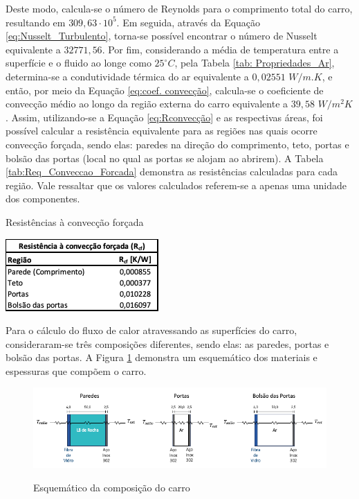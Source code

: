 \documentclass[acronym,symbols,table]{fei}
\begin{document}
Deste modo, calcula-se o número de Reynolds para o comprimento total do carro, resultando em $309,63 \cdot 10^5$. Em seguida, através da Equação \ref{eq:Nusselt_Turbulento}, torna-se possível encontrar o número de Nusselt equivalente a $32771,56$. Por fim, considerando a média de temperatura entre a superfície e o fluido ao longe como $25^\circ C$, pela Tabela \ref{tab: Propriedades_Ar}, determina-se a condutividade térmica do ar equivalente a $0,02551$ $W/m.K$, e então, por meio da Equação \ref{eq:coef. convecção}, calcula-se o coeficiente de convecção médio ao longo da região externa do carro equivalente a $39,58$ $W/m^2 K$. Assim, utilizando-se a Equação \ref{eq:Rconvecção} e as respectivas áreas, foi possível calcular a resistência equivalente para as regiões nas quais ocorre convecção forçada, sendo elas: paredes na direção do comprimento, teto, portas e bolsão das portas (local no qual as portas se alojam ao abrirem). A Tabela \ref{tab:Req_Conveccao_Forcada} demonstra as resistências calculadas para cada região. Vale ressaltar que os valores calculados referem-se a apenas uma unidade dos componentes. 

\begin{table}[!htb]
 \centering
    \caption{Resistências à convecção forçada}
    \includegraphics[width=0.4\linewidth]{Tabelas/Req_Conveccao_Forcada.png}
    \label{tab:Req_Conveccao_Forcada}
\end{table}

Para o cálculo do fluxo de calor atravessando as superfícies do carro, consideraram-se três composições diferentes, sendo elas: as paredes, portas e bolsão das portas. A Figura \ref{fig:Composicao_Vagao} demonstra um esquemático dos materiais e espessuras que compõem o carro.

\begin{figure}[!htb] 
    \centering
    \caption{Esquemático da composição do carro}
    \includegraphics[width=0.9\linewidth]{Imagens/Composicao_Vagao.png}
    \label{fig:Composicao_Vagao}
\end{figure}
\end{document}
